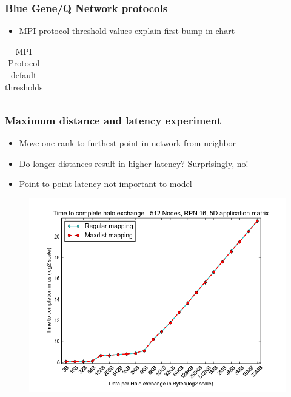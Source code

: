 \documentclass{beamer}
\begin{document}
\begin{frame}[fragile]
\frametitle{Blue Gene/Q Network protocols}
\begin{itemize}
    \item MPI protocol threshold values explain first bump in chart
\end{itemize}
\begin{table}
  \caption{MPI Protocol default thresholds
    \label{table:bgq_protocols}}
  {\footnotesize
    \begin{tabular}{ | l | l | l | p{1.5cm} |}
    \hline 
    
    \end{tabular}
  }
\end{table}
\end{frame}

\begin{frame}
\frametitle{Maximum distance and latency experiment}
\begin{itemize}
    \item Move one rank to furthest point in network from neighbor
    \item Do longer distances result in higher latency? Surprisingly, no!
    \item Point-to-point latency not important to model
\end{itemize}
\vspace{-1em}
\begin{figure}
\includegraphics[width=0.8\linewidth]{../regular_vs_maxdist.png}
\end{figure}
\end{frame}
\end{document}
